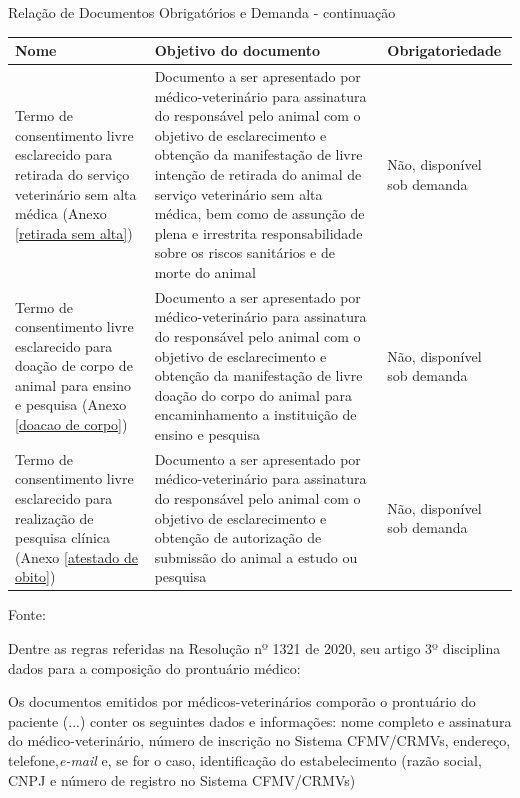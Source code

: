 \documentclass[
    12pt,               %
    openright,          %
    oneside,
    a4paper,            %
    BIBLATEX,           %
    TODO,               %
    english,            %
    brazil              %
    ]{ifsp-spo-inf-ctds}
\begin{document}

\begin{center}

    \begin{quadro}[H]
    \caption{Relação de Documentos Obrigatórios e Demanda - continuação}
    \begin{tabulary}{1.0\textwidth}{|p{10em}|p{15em}|p{10em}|}
    \hline
    Nome & Objetivo do documento & Obrigatoriedade\\
    \hline
    Termo de consentimento livre esclarecido para retirada do serviço veterinário sem alta médica (Anexo \ref{retirada sem alta}) & Documento a ser apresentado por médico-veterinário para assinatura do responsável pelo animal com o objetivo de esclarecimento e obtenção da manifestação de livre intenção de retirada do animal de serviço veterinário sem alta médica, bem como de assunção de plena e irrestrita responsabilidade sobre os riscos sanitários e de morte do animal & Não, disponível sob demanda\\
    \hline   
    Termo de consentimento livre esclarecido para doação de corpo de animal para ensino e pesquisa (Anexo \ref{doacao de corpo}) & Documento a ser apresentado por médico-veterinário para assinatura do responsável pelo animal com o objetivo de esclarecimento e obtenção da manifestação de livre doação do corpo do animal para encaminhamento a instituição de ensino e pesquisa & Não, disponível sob demanda\\
    \hline
    Termo de consentimento livre esclarecido para realização de pesquisa clínica (Anexo \ref{atestado de obito}) & Documento a ser apresentado por médico-veterinário para assinatura do responsável pelo animal com o objetivo de esclarecimento e obtenção de autorização de submissão do animal a estudo ou pesquisa & Não, disponível sob demanda\\
    \hline
    \end{tabulary}   
    \label{quad:documentos3}
    \centering
    {\footnotesize Fonte: }
    \end{quadro}
\end{center}

        Dentre as regras referidas na Resolução nº 1321 de 2020, seu artigo 3º disciplina dados para a composição do prontuário médico:

        \begin{citacao}

        
            Os documentos emitidos por médicos-veterinários comporão o prontuário do paciente (...) conter os seguintes dados e informações: nome completo e assinatura do médico-veterinário, número de inscrição no Sistema CFMV/CRMVs, endereço, telefone,\emph{e-mail} e, se for o caso, identificação do estabelecimento (razão social, CNPJ e número de registro no Sistema CFMV/CRMVs)
        \end{citacao}
\end{document}
